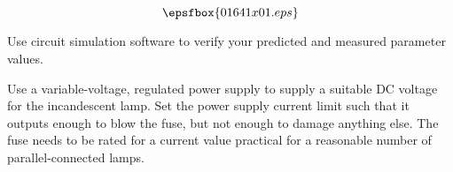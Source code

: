 

$$\epsfbox{01641x01.eps}$$

\vfil \eject






Use circuit simulation software to verify your predicted and measured parameter values.







Use a variable-voltage, regulated power supply to supply a suitable DC voltage for the incandescent lamp.  Set the power supply current limit such that it outputs enough to blow the fuse, but not enough to damage anything else.  The fuse needs to be rated for a current value practical for a reasonable number of parallel-connected lamps.




